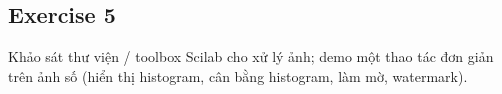 \subsection{Exercise 5}
Khảo sát thư viện / toolbox Scilab cho xử lý ảnh; demo một thao tác đơn giản trên ảnh số (hiển thị histogram, cân bằng histogram, làm mờ, watermark).



